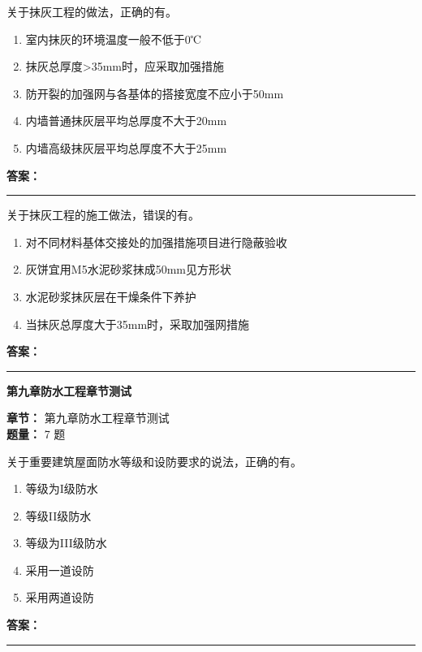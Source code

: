 \documentclass[UTF8,fontset=fandol,11pt]{ctexart}
\newcommand{\chaptertitle}[1]{\vspace{0.5em}\begin{tcolorbox}[enhanced,colback=deepblue,colframe=deepblue,arc=2mm,boxrule=0pt]\begin{center}\Large\bfseries\color{white}#1\end{center}\end{tcolorbox}\vspace{0.5em}}
\newcommand{\answerline}{\textcolor{answerred}{\rule{2.4cm}{0.7pt}}}
\begin{document}
\begin{quizbox}[title={第 1 题}]
关于抹灰工程的做法，正确的有。\\
\begin{enumerate}[label=\Alph*.]
\item 室内抹灰的环境温度一般不低于0℃
\item 抹灰总厚度>35mm时，应采取加强措施
\item 防开裂的加强网与各基体的搭接宽度不应小于50mm
\item 内墙普通抹灰层平均总厚度不大于20mm
\item 内墙高级抹灰层平均总厚度不大于25mm
\end{enumerate}
\textbf{\textcolor{answerred}{答案：}} \answerline
\end{quizbox}

\begin{quizbox}[title={第 2 题}]
关于抹灰工程的施工做法，错误的有。\\
\begin{enumerate}[label=\Alph*.]
\item 对不同材料基体交接处的加强措施项目进行隐蔽验收
\item 灰饼宜用M5水泥砂浆抹成50mm见方形状
\item 水泥砂浆抹灰层在干燥条件下养护
\item 当抹灰总厚度大于35mm时，采取加强网措施
\end{enumerate}
\textbf{\textcolor{answerred}{答案：}} \answerline
\end{quizbox}

\chaptertitle{第九章防水工程章节测试}
\begin{mainbox}
\textbf{\textcolor{mainblue}{章节：}} 第九章防水工程章节测试\\
\textbf{\textcolor{answerred}{题量：}} 7 题
\end{mainbox}

\begin{quizbox}[title={第 1 题}]
关于重要建筑屋面防水等级和设防要求的说法，正确的有。\\
\begin{enumerate}[label=\Alph*.]
\item 等级为I级防水
\item 等级II级防水
\item 等级为III级防水
\item 采用一道设防
\item 采用两道设防
\end{enumerate}
\textbf{\textcolor{answerred}{答案：}} \answerline
\end{quizbox}
\end{document}
